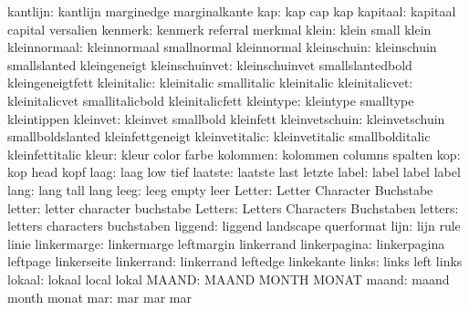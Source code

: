            kantlijn:  kantlijn             marginedge          marginalkante
                kap:  kap                  cap                 kap
           kapitaal:  kapitaal             capital             versalien
            kenmerk:  kenmerk              referral            merkmal
              klein:  klein                small               klein
       kleinnormaal:  kleinnormaal         smallnormal         kleinnormal
        kleinschuin:  kleinschuin          smallslanted        kleingeneigt
     kleinschuinvet:  kleinschuinvet       smallslantedbold    kleingeneigtfett
        kleinitalic:  kleinitalic          smallitalic         kleinitalic
     kleinitalicvet:  kleinitalicvet       smallitalicbold     kleinitalicfett
          kleintype:  kleintype            smalltype           kleintippen
           kleinvet:  kleinvet             smallbold           kleinfett
     kleinvetschuin:  kleinvetschuin       smallboldslanted    kleinfettgeneigt
     kleinvetitalic:  kleinvetitalic       smallbolditalic     kleinfettitalic
              kleur:  kleur                color               farbe
           kolommen:  kolommen             columns             spalten
                kop:  kop                  head                kopf
               laag:  laag                 low                 tief
            laatste:  laatste              last                letzte
              label:  label                label               label
               lang:  lang                 tall                lang
               leeg:  leeg                 empty               leer
             Letter:  Letter               Character           Buchstabe
             letter:  letter               character           buchstabe
            Letters:  Letters              Characters          Buchstaben
            letters:  letters              characters          buchstaben
            liggend:  liggend              landscape           querformat
               lijn:  lijn                 rule                linie
        linkermarge:  linkermarge          leftmargin          linkerrand
       linkerpagina:  linkerpagina         leftpage            linkerseite
         linkerrand:  linkerrand           leftedge            linkekante
              links:  links                left                links
             lokaal:  lokaal               local               lokal
              MAAND:  MAAND                MONTH               MONAT
              maand:  maand                month               monat
                mar:  mar                  mar                 mar
